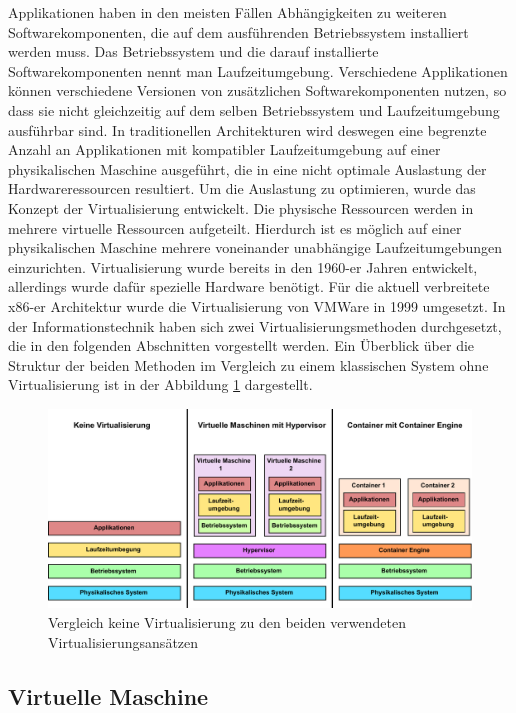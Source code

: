 Applikationen haben in den meisten Fällen Abhängigkeiten zu weiteren Softwarekomponenten, die auf dem ausführenden Betriebssystem installiert werden muss. Das Betriebssystem und die darauf installierte Softwarekomponenten nennt man Laufzeitumgebung. Verschiedene Applikationen können verschiedene Versionen von zusätzlichen Softwarekomponenten nutzen, so dass sie nicht gleichzeitig auf dem selben Betriebssystem und Laufzeitumgebung ausführbar sind. In traditionellen Architekturen wird deswegen eine begrenzte Anzahl an Applikationen mit kompatibler Laufzeitumgebung auf einer physikalischen Maschine ausgeführt, die in eine nicht optimale Auslastung der Hardwareressourcen resultiert. Um die Auslastung zu optimieren, wurde das Konzept der Virtualisierung entwickelt. Die physische Ressourcen werden in mehrere virtuelle Ressourcen aufgeteilt. Hierdurch ist es möglich auf einer physikalischen Maschine mehrere voneinander unabhängige Laufzeitumgebungen einzurichten. Virtualisierung wurde bereits in den 1960-er Jahren entwickelt, allerdings wurde dafür spezielle Hardware benötigt. Für die aktuell verbreitete x86-er Architektur wurde die Virtualisierung von VMWare in 1999 umgesetzt. \cite{Bugnion2012} In der Informationstechnik haben sich zwei Virtualisierungsmethoden durchgesetzt, die in den folgenden Abschnitten vorgestellt werden. Ein Überblick über die Struktur der beiden Methoden im Vergleich zu einem klassischen System ohne Virtualisierung ist in der Abbildung \ref{virtualisierung_optionen} dargestellt. 

\begin{figure}[htbp]
	\centering
	\includegraphics[width=\textwidth]{./content/graphics/applikation_management.pdf}
	\caption{Vergleich keine Virtualisierung zu den beiden verwendeten Virtualisierungsansätzen}
	\label{virtualisierung_optionen}
\end{figure}

\subsection{Virtuelle Maschine}

